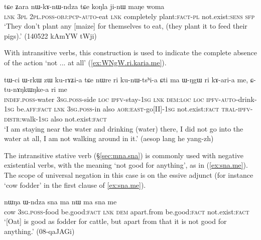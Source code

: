 \begin{exe}
\ex \label{ex:jinW.maNe}
\gll tɕe ʑara nɯ-kɤ-nɯ-ndza tɕe koŋla ji-nɯ maŋe woma \\
\textsc{lnk} \textsc{3pl} \textsc{2pl}.\textsc{poss}-\textsc{obj}:\textsc{pcp}-\textsc{auto}-eat \textsc{lnk} completely plant:\textsc{fact}-\textsc{pl} not.exist:\textsc{sens} \textsc{sfp} \\
\glt `They don't  plant any [maize] for themselves to  eat, (they plant it to feed their pigs).'  (140522 kAmYW tWji)
\end{exe}

With intransitive verbs, this construction is used to indicate the complete absence of the action `not ... at all' (\ref{ex:WNgW.ri.karia.me}).

\begin{exe}
\ex \label{ex:WNgW.ri.karia.me} 
\gll  tɯ-ci ɯ-rkɯ zɯ ku-rɤʑi-a tɕe nɯre ri ku-nɯ-tsʰi-a ɕti ma ɯ-ŋgɯ ri kɤ-ari-a me, ɕ-tu-nɤŋkɯŋke-a ri me \\
\textsc{indef}.\textsc{poss}-water \textsc{3sg}.\textsc{poss}-side \textsc{loc} \textsc{ipfv}-stay-\textsc{1sg} \textsc{lnk} \textsc{dem}:\textsc{loc} \textsc{loc} \textsc{ipfv}-\textsc{auto}-drink-\textsc{1sg} be.\textsc{aff}:\textsc{fact} \textsc{lnk} \textsc{3sg}.\textsc{poss}-in also \textsc{aor}:\textsc{east}-go[II]-\textsc{1sg} not.exist:\textsc{fact} \textsc{tral}-\textsc{ipfv}-\textsc{distr}:walk-\textsc{1sg} also not.exist:\textsc{fact} \\
\glt `I am staying near the water and drinking (water) there, I did not go into the water at all, I am not walking around in it.' (aesop lang he yang-zh)
\end{exe}

The intransitive stative verb  (§\ref{sec:mna.sna}) is commonly used with negative existential verbs, with the meaning `not good for anything', as in (\ref{ex:sna.me}). The scope of universal negation in this case is on the essive adjunct (for instance  `cow fodder' in the first clause of \ref{ex:sna.me}).

\begin{exe}
\ex \label{ex:sna.me} 
\gll nɯŋa ɯ-ndza sna ma nɯ ma sna me \\
cow \textsc{3sg}.\textsc{poss}-food be.good:\textsc{fact} \textsc{lnk} \textsc{dem} apart.from be.good:\textsc{fact} not.exist:\textsc{fact} \\
\glt `[Oat] is good as fodder for cattle, but apart from that it is not good for anything.' (08-qaJAGi)
\end{exe}

